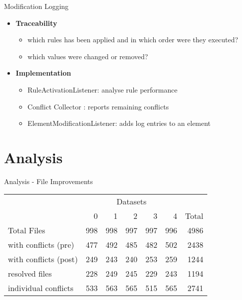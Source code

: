 \documentclass{beamer}
\begin{document}
\begin{frame}{Modification Logging}

   \begin{itemize}
   \item \textbf{Traceability}
   \begin{itemize}
	   \item which rules has been applied and in which order were they executed?
	   \item which values were changed or removed?
   \end{itemize}
   \item \textbf{Implementation}
   \begin{itemize}
   		\item RuleActivationListener: analyse rule performance
   		\item Conflict Collector : reports remaining conflicts
   		\item ElementModificationListener: adds log entries to an element
   \end{itemize}
   \end{itemize}
  
\note{

}
\end{frame}

\section{Analysis}

\begin{frame}{Analysis - File Improvements}

\begin{table}[ht]
\begin{center}

\begin{tabular}[h]{l||r|r|r|r|r||r}
 &  \multicolumn{5}{c}{Datasets} \\
        & 0 & 1 & 2 & 3 & 4 & Total \\
\hline
Total Files & 998 & 998 & 997 & 997 & 996 & 4986\\ 
\hline
with conflicts (pre) & 477 &	492 & 485 & 482	& 502 &	2438\\ 
with conflicts (post) & 249	& 243 &	240 & 253 &	259 & 1244\\
\hline
resolved files & 228 & 249 & 245 & 229 & 243 & 1194 \\
individual conflicts & 533 & 563 & 565 & 515 & 565 & 2741 \\


\end{tabular}
\end{center}
\end{table}

  \note{

  }

\end{frame}
\end{document}
